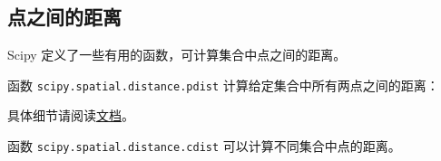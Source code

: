 \subsection{点之间的距离} %
\begin{frame}

Scipy 定义了一些有用的函数，可计算集合中点之间的距离。


函数 \lstinline|scipy.spatial.distance.pdist| 计算给定集合中所有两点之间的距离：


具体细节请阅读\href{http://docs.scipy.org/doc/scipy/reference/generated/scipy.spatial.distance.pdist.html}{文档}。

函数 \lstinline|scipy.spatial.distance.cdist| 可以计算不同集合中点的距离。
\end{frame}
